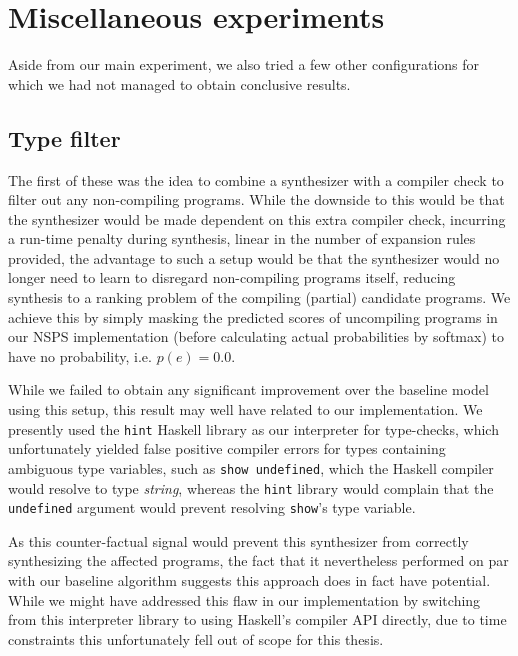 \documentclass{article}
\begin{document}
\section{Miscellaneous experiments}

Aside from our main experiment, we also tried a few other configurations for which we had not managed to obtain conclusive results.

\subsection{Type filter}

The first of these was the idea to combine a synthesizer with a compiler check to filter out any non-compiling programs.
While the downside to this would be that the synthesizer would be made dependent on this extra compiler check,
incurring a run-time penalty during synthesis, linear in the number of expansion rules provided,
the advantage to such a setup would be that the synthesizer would no longer need to learn to disregard non-compiling programs itself,
reducing synthesis to a ranking problem of the compiling (partial) candidate programs.
% 
% 
We achieve this by simply masking the predicted scores of uncompiling programs in our NSPS implementation
(before calculating actual probabilities by softmax) to have no probability, i.e. $p(e)=0.0$.

While we failed to obtain any significant improvement over the baseline model using this setup,
this result may well have related to our implementation.
We presently used the \verb|hint| Haskell library as our interpreter for type-checks,
which unfortunately yielded false positive compiler errors for types containing ambiguous type variables,
such as \verb|show undefined|, which the Haskell compiler would resolve to type \emph{string},
whereas the \verb|hint| library would complain that the \verb|undefined|
argument would prevent resolving \verb|show|'s type variable.~\citep{hintambiguous}

As this counter-factual signal would prevent this synthesizer from correctly synthesizing the affected programs,
the fact that it nevertheless performed on par with our baseline algorithm suggests this approach does in fact have potential.
While we might have addressed this flaw in our implementation by switching
from this interpreter library to using Haskell's compiler API directly,
due to time constraints this unfortunately fell out of scope for this thesis.
\end{document}
